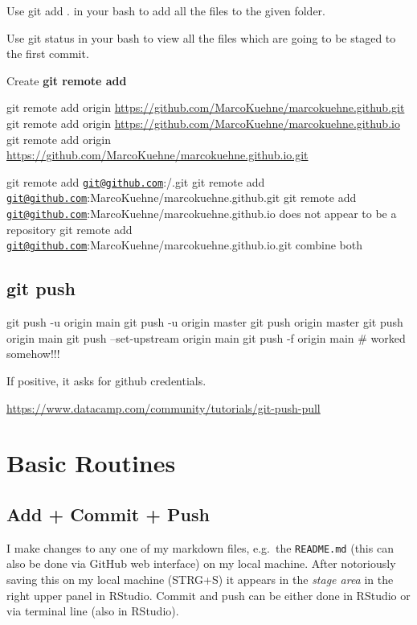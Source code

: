 \documentclass[
]{book}
\begin{document}
Use git add . in your bash to add all the files to the given folder.

Use git status in your bash to view all the files which are going to be staged to the first commit.

Create \textbf{git remote add}

git remote add origin \url{https://github.com/MarcoKuehne/marcokuehne.github.git}
git remote add origin \url{https://github.com/MarcoKuehne/marcokuehne.github.io}
git remote add origin \url{https://github.com/MarcoKuehne/marcokuehne.github.io.git}

git remote add \href{mailto:git@github.com}{\nolinkurl{git@github.com}}:/.git
git remote add \href{mailto:git@github.com}{\nolinkurl{git@github.com}}:MarcoKuehne/marcokuehne.github.git
git remote add \href{mailto:git@github.com}{\nolinkurl{git@github.com}}:MarcoKuehne/marcokuehne.github.io does not appear to be a repository
git remote add \href{mailto:git@github.com}{\nolinkurl{git@github.com}}:MarcoKuehne/marcokuehne.github.io.git combine both

\hypertarget{git-push}{%
\subsection{git push}\label{git-push}}

git push -u origin main
git push -u origin master
git push origin master
git push origin main
git push --set-upstream origin main
git push -f origin main \# worked somehow!!!

If positive, it asks for github credentials.

\url{https://www.datacamp.com/community/tutorials/git-push-pull}

\hypertarget{basic-routines}{%
\section{Basic Routines}\label{basic-routines}}

\hypertarget{add-commit-push}{%
\subsection{Add + Commit + Push}\label{add-commit-push}}

I make changes to any one of my markdown files, e.g.~the \texttt{README.md} (this can also be done via GitHub web interface) on my local machine. After notoriously saving this on my local machine (STRG+S) it appears in the \emph{stage area} in the right upper panel in RStudio. Commit and push can be either done in RStudio or via terminal line (also in RStudio).
\end{document}
